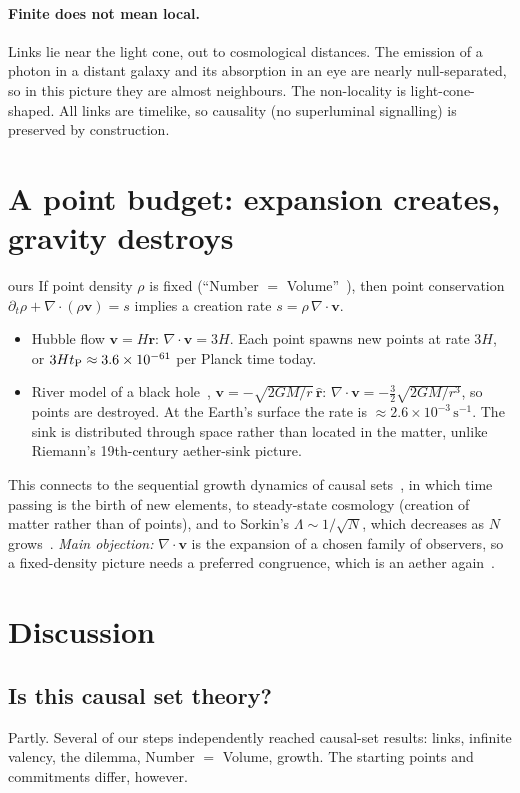 \documentclass[11pt,a4paper]{article}
\newcommand{\tagbox}[2]{\textsf{\scriptsize\colorbox{#1!12}{\textcolor{#1!70!black}{#2}}}}
\newcommand{\ours}{\tagbox{orange}{ours}}
\begin{document}
\paragraph{Finite does not mean local.} Links lie near the light cone, out to cosmological distances. The emission of a photon in a distant galaxy and its absorption in an eye are nearly null-separated, so in this picture they are almost neighbours. The non-locality is light-cone-shaped. All links are timelike, so causality (no superluminal signalling) is preserved by construction.

\section{A point budget: expansion creates, gravity destroys}
\ours{} If point density $\rho$ is fixed (``Number $=$ Volume''~\cite{Surya19}), then point conservation $\partial_t\rho+\nabla\!\cdot(\rho\mathbf v)=s$ implies a creation rate $s=\rho\,\nabla\!\cdot\mathbf v$.
\begin{itemize}[leftmargin=*]
\item Hubble flow $\mathbf v=H\mathbf r$: $\nabla\!\cdot\mathbf v=3H$. Each point spawns new points at rate $3H$, or $3Ht_{\rm P}\approx3.6\times10^{-61}$ per Planck time today.
\item River model of a black hole~\cite{HamiltonLisle08}, $\mathbf v=-\sqrt{2GM/r}\,\hat{\mathbf r}$: $\nabla\!\cdot\mathbf v=-\tfrac32\sqrt{2GM/r^3}$, so points are destroyed. At the Earth's surface the rate is $\approx2.6\times10^{-3}\,\mathrm{s}^{-1}$. The sink is distributed through space rather than located in the matter, unlike Riemann's 19th-century aether-sink picture.
\end{itemize}
This connects to the sequential growth dynamics of causal sets~\cite{RideoutSorkin00}, in which time passing is the birth of new elements, to steady-state cosmology (creation of matter rather than of points), and to Sorkin's $\Lambda\sim1/\sqrt N$, which decreases as $N$ grows~\cite{ADGS04}. \emph{Main objection:} $\nabla\!\cdot\mathbf v$ is the expansion of a chosen family of observers, so a fixed-density picture needs a preferred congruence, which is an aether again~\cite{JacobsonMattingly01}.

\section{Discussion}
\subsection{Is this causal set theory?}
Partly. Several of our steps independently reached causal-set results: links, infinite valency, the dilemma, Number $=$ Volume, growth. The starting points and commitments differ, however.
\end{document}
